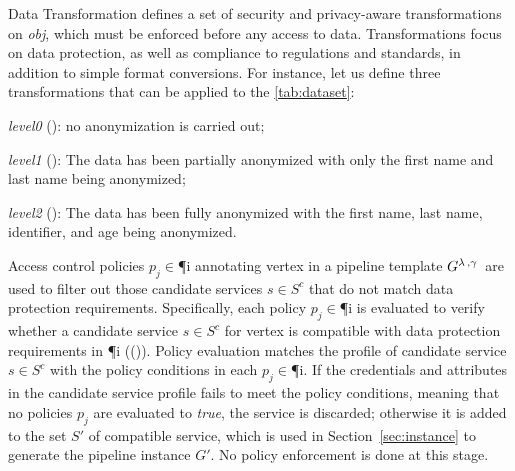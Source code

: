 \begin{definition}[Policy]
\begin{description}
          \item Data Transformation \textit{\TP} defines a set of security and privacy-aware transformations on \textit{obj}, which must be enforced before any access to data.
                Transformations focus on data protection, as well as compliance to regulations and standards, in addition to simple format conversions.
                For instance, let us define three transformations that can be applied to the \cref{tab:dataset}:
                \begin{enumerate*}[label=\roman*)]
                  \item \emph{level0} (): no anonymization is carried out;
                  \item \emph{level1} (): The data has been partially anonymized with only the first name and last name being anonymized;
                  \item \emph{level2} (): The data has been fully anonymized with the first name, last name, identifier, and age being anonymized.
                \end{enumerate*}
        \end{description}
      \end{definition}

      Access control policies $p_j$$\in$\P{i} annotating vertex  in a pipeline template $G^{\lambda\,,\gamma\,}$ are used to filter out those candidate services $s$$\in$$S^c$ that do not match data protection requirements. Specifically, each policy $p_j$$\in$\P{i} is evaluated to verify whether a candidate service $s$$\in$$S^c$ for vertex  is compatible with data protection requirements in \P{i} (\myLambda()). Policy evaluation matches the profile of candidate service $s$$\in$$S^c$ with the policy conditions in each $p_j$$\in$\P{i}. If the credentials and attributes in the candidate service profile fails to meet the policy conditions, meaning that no policies $p_j$ are evaluated to \emph{true}, the service is discarded; otherwise it is added to the set $S'$ of compatible service, which is used in Section~\ref{sec:instance} to generate the pipeline instance $G'$. No policy enforcement is done at this stage.
